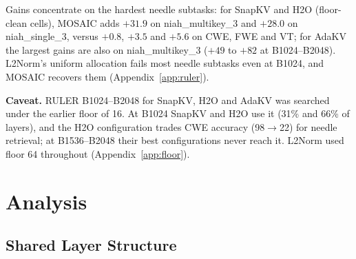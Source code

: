 \documentclass[11pt]{article}
\begin{document}
Gains concentrate on the hardest needle subtasks: for SnapKV and H2O (floor-clean cells), MOSAIC adds $+31.9$ on niah\_multikey\_3 and $+28.0$ on niah\_single\_3, versus $+0.8$, $+3.5$ and $+5.6$ on CWE, FWE and VT; for AdaKV the largest gains are also on niah\_multikey\_3 ($+49$ to $+82$ at B1024--B2048). L2Norm's uniform allocation fails most needle subtasks even at B1024, and MOSAIC recovers them (Appendix~\ref{app:ruler}).

\textbf{Caveat.} RULER B1024--B2048 for SnapKV, H2O and AdaKV was searched under the earlier floor of 16. At B1024 SnapKV and H2O use it (31\% and 66\% of layers), and the H2O configuration trades CWE accuracy (98$\rightarrow$22) for needle retrieval; at B1536--B2048 their best configurations never reach it. L2Norm used floor 64 throughout (Appendix~\ref{app:floor}).




\section{Analysis}



\subsection{Shared Layer Structure}
\label{sec:shared}
\end{document}
